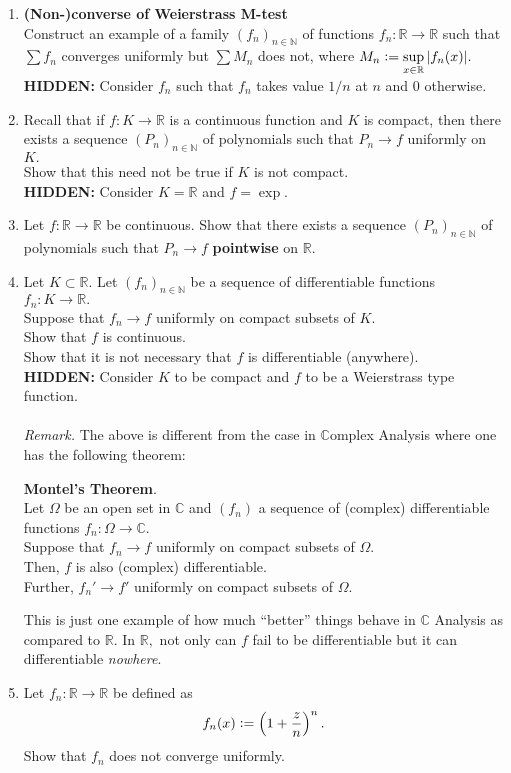\documentclass[12pt]{article}
\theoremstyle{definition}
\numberwithin{thm}{section}
\newcommand{\hint}[1]{\textbf{HIDDEN:} {\color[rgb]{0.95, 0.95, 0.95}#1}}
\newenvironment{blockquote}
{\begin{mdframed}[skipabove=0pt, skipbelow=0pt, innertopmargin=4pt, innerbottommargin=4pt, bottomline=false,topline=false,rightline=false, linewidth=2pt]}
{\end{mdframed}}
\begin{document}
\begin{enumerate}
	\item \textbf{(Non-)converse of Weierstrass M-test}\\
	Construct an example of a family $(f_n)_{n \in \mathbb{N}}$ of functions $f_n:\mathbb{R} \to \mathbb{R}$ such that $\sum f_n$ converges uniformly but $\sum M_n$ does not, where $M_n \vcentcolon= \displaystyle\sup_{x \in \mathbb{R}}|f_n(x)|.$\\
	\hint{Consider $f_n$ such that $f_n$ takes value $1/n$ at $n$ and $0$ otherwise.}
	\item Recall that if $f:K \to \mathbb{R}$ is a continuous function and $K$ is compact, then there exists a sequence $(P_n)_{n \in \mathbb{N}}$ of polynomials such that $P_n \to f$ uniformly on $K.$\\
	Show that this need not be true if $K$ is not compact.\\
	\hint{Consider $K = \mathbb{R}$ and $f = \exp.$}
	\item Let $f:\mathbb{R} \to \mathbb{R}$ be continuous. Show that there exists a sequence $(P_n)_{n \in \mathbb{N}}$ of polynomials such that $P_n \to f$ \textbf{pointwise} on $\mathbb{R}.$
	\item Let $K \subset \mathbb{R}.$ Let $(f_n)_{n \in \mathbb{N}}$ be a sequence of differentiable functions $f_n:K \to \mathbb{R}.$\\
	Suppose that $f_n\to f$ uniformly on compact subsets of $K.$\\
	Show that $f$ is continuous.\\
	Show that it is not necessary that $f$ is differentiable (anywhere).\\
	\hint{Consider $K$ to be compact and $f$ to be a Weierstrass type function.}\\~\\
	\emph{Remark.} The above is different from the case in $\mathbb{C}$omplex Analysis where one has the following theorem:\\
	\begin{blockquote}
		\textbf{Montel's Theorem}.\\
		Let $\Omega$ be an open set in $\mathbb{C}$ and $(f_n)$ a sequence of (complex) differentiable functions $f_n:\Omega \to \mathbb{C}.$\\
		Suppose that $f_n\to f$ uniformly on compact subsets of $\Omega.$\\
		Then, $f$ is also (complex) differentiable.\\
		Further, $f_n' \to f'$ uniformly on compact subsets of $\Omega.$
	\end{blockquote}
	This is just one example of how much ``better'' things behave in $\mathbb{C}$ Analysis as compared to $\mathbb{R}.$ In $\mathbb{R},$ not only can $f$ fail to be differentiable but it can differentiable \emph{nowhere}.
	\item Let $f_n:\mathbb{R} \to \mathbb{R}$ be defined as
	\begin{equation*} 
		f_n(x) \vcentcolon= \left(1 + \dfrac{z}{n}\right)^n.
	\end{equation*}
	Show that $f_n$ does not converge uniformly.
\end{enumerate}
\end{document}
